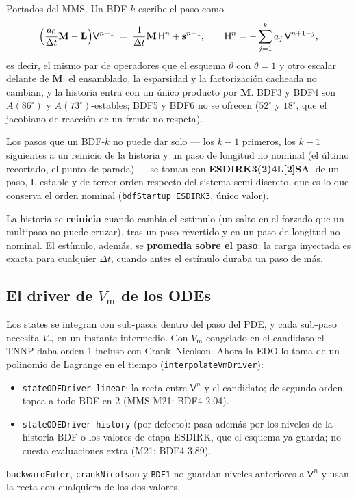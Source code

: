 \documentclass[11pt,a4paper]{article}
\newcommand{\code}[1]{\texttt{\small #1}}
\newcommand{\Vm}{V_{\text{m}}}
\newcommand{\Mmass}{\mathbf{M}}
\newcommand{\Lop}{\mathbf{L}}
\begin{document}
Portados del MMS. Un BDF-$k$ escribe el paso como
\begin{equation}
  \Bigl(\frac{a_0}{\Delta t}\Mmass - \Lop\Bigr)\mathsf{V}^{n+1}
  \;=\; \frac{1}{\Delta t}\Mmass\,\mathsf{H}^{n} + \mathbf{s}^{n+1},
  \qquad
  \mathsf{H}^{n} = -\sum_{j=1}^{k} a_j\,\mathsf{V}^{n+1-j},
\end{equation}
es decir, el mismo par de operadores que el esquema $\theta$ con $\theta=1$ y otro
escalar delante de $\Mmass$: el ensamblado, la esparsidad y la factorización
cacheada no cambian, y la historia entra con un único producto por $\Mmass$.
BDF3 y BDF4 son $A(86^\circ)$ y $A(73^\circ)$-estables; BDF5 y BDF6 no se ofrecen
($52^\circ$ y $18^\circ$, que el jacobiano de reacción de un frente no respeta).

Los pasos que un BDF-$k$ no puede dar solo --- los $k-1$ primeros, los $k-1$
siguientes a un reinicio de la historia y un paso de longitud no nominal (el
último recortado, el punto de parada) --- se toman con \textbf{ESDIRK3(2)4L[2]SA},
de un paso, L-estable y de tercer orden respecto del sistema semi-discreto, que es
lo que conserva el orden nominal (\code{bdfStartup ESDIRK3}, único valor).

La historia se \textbf{reinicia} cuando cambia el estímulo (un salto en el forzado
que un multipaso no puede cruzar), tras un paso revertido y en un paso de
longitud no nominal. El estímulo, además, se \textbf{promedia sobre el paso}:
la carga inyectada es exacta para cualquier $\Delta t$, cuando antes el estímulo
duraba un paso de más.

\subsection{El driver de \texorpdfstring{$\Vm$}{Vm} de los ODEs}
\label{sec:oct-driver}

Los states se integran con sub-pasos dentro del paso del PDE, y cada sub-paso
necesita $\Vm$ en un instante intermedio. Con $\Vm$ congelado en el candidato el
TNNP daba orden 1 incluso con Crank--Nicolson. Ahora la EDO lo toma de un
polinomio de Lagrange en el tiempo (\code{interpolateVmDriver}):
\begin{itemize}[nosep]
  \item \code{stateODEDriver linear}: la recta entre $\mathsf{V}^{n}$ y el
        candidato; de segundo orden, topea a todo BDF en 2 (MMS M21: BDF4 2.04).
  \item \code{stateODEDriver history} (por defecto): pasa además por los niveles
        de la historia BDF o los valores de etapa ESDIRK, que el esquema ya
        guarda; no cuesta evaluaciones extra (M21: BDF4 3.89).
\end{itemize}
\code{backwardEuler}, \code{crankNicolson} y \code{BDF1} no guardan niveles
anteriores a $\mathsf{V}^n$ y usan la recta con cualquiera de los dos valores.
\end{document}
